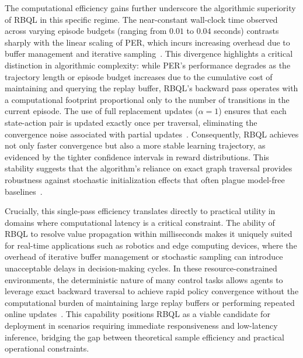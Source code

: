 \documentclass[manuscript, screen, review]{jair}
\begin{document}
The computational efficiency gains further underscore the algorithmic superiority of RBQL in this specific regime. The near-constant wall-clock time observed across varying episode budgets (ranging from $0.01$ to $0.04$ seconds) contrasts sharply with the linear scaling of PER, which incurs increasing overhead due to buffer management and iterative sampling~\cite{Hong2022TopologicalER}. This divergence highlights a critical distinction in algorithmic complexity: while PER's performance degrades as the trajectory length or episode budget increases due to the cumulative cost of maintaining and querying the replay buffer, RBQL's backward pass operates with a computational footprint proportional only to the number of transitions in the current episode. The use of full replacement updates ($\alpha=1$) ensures that each state-action pair is updated exactly once per traversal, eliminating the convergence noise associated with partial updates~\cite{Meyn2024ThePB}. Consequently, RBQL achieves not only faster convergence but also a more stable learning trajectory, as evidenced by the tighter confidence intervals in reward distributions. This stability suggests that the algorithm's reliance on exact graph traversal provides robustness against stochastic initialization effects that often plague model-free baselines~\cite{Gul2025TheRO}.

Crucially, this single-pass efficiency translates directly to practical utility in domains where computational latency is a critical constraint. The ability of RBQL to resolve value propagation within milliseconds makes it uniquely suited for real-time applications such as robotics and edge computing devices, where the overhead of iterative buffer management or stochastic sampling can introduce unacceptable delays in decision-making cycles. In these resource-constrained environments, the deterministic nature of many control tasks allows agents to leverage exact backward traversal to achieve rapid policy convergence without the computational burden of maintaining large replay buffers or performing repeated online updates~\cite{Lee2018SampleEfficientDR}. This capability positions RBQL as a viable candidate for deployment in scenarios requiring immediate responsiveness and low-latency inference, bridging the gap between theoretical sample efficiency and practical operational constraints.
\end{document}
